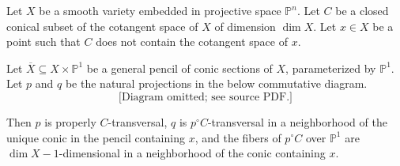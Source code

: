 \begin{lemma}
\notready\label{genericity-lemma} Let $X$ be a smooth variety embedded in projective space $\mathbb P^n$. Let $C$ be a closed conical subset of the cotangent space of $X$ of dimension $\dim X$. Let $x \in X$ be a point such that $C$ does not contain the cotangent space of $x$.

Let $\overline{X} \subseteq X \times \mathbb P^1$ be a general pencil of conic sections of $X$, parameterized by $\mathbb P^1$.  Let $p$ and $q$ be the natural projections in the below commutative diagram.\begin{equation}\label{pq-diagram}\text{[Diagram omitted; see source PDF.]} \end{equation}

Then $p$ is properly $C$-transversal, $q$ is $p^{\circ} C$-transversal in a neighborhood of the unique conic in the pencil containing $x$, and the fibers of $p^\circ C$ over $\mathbb P^1$ are $\dim X-1$-dimensional in a neighborhood of the conic containing $x$. \end{lemma}

